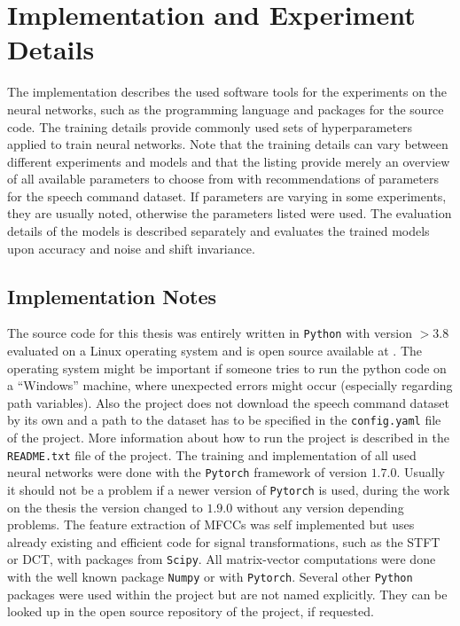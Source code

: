 
\section{Implementation and Experiment Details}\label{sec:exp_details}
The implementation describes the used software tools for the experiments on the neural networks, such as the programming language and packages for the source code.
The training details provide commonly used sets of hyperparameters applied to train neural networks.
Note that the training details can vary between different experiments and models and that the listing provide merely an overview of all available parameters to choose from with recommendations of parameters for the speech command dataset.
If parameters are varying in some experiments, they are usually noted, otherwise the parameters listed were used.
The evaluation details of the models is described separately and evaluates the trained models upon accuracy and noise and shift invariance.



\subsection{Implementation Notes}\label{sec:exp_details_implementation}
The source code for this thesis was entirely written in \texttt{Python} with version $>3.8$ evaluated on a Linux operating system and is open source available at \cite{KWSGame}.
The operating system might be important if someone tries to run the python code on a \enquote{Windows} machine, where unexpected errors might occur (especially regarding path variables).
Also the project does not download the speech command dataset by its own and a path to the dataset has to be specified in the \texttt{config.yaml} file of the project.
More information about how to run the project is described in the \texttt{README.txt} file of the project.
The training and implementation of all used neural networks were done with the \texttt{Pytorch} \cite{Pytorch} framework of version $1.7.0$. 
Usually it should not be a problem if a newer version of \texttt{Pytorch} is used, during the work on the thesis the version changed to $1.9.0$ without any version depending problems.
The feature extraction of MFCCs was self implemented but uses already existing and efficient code for signal transformations, such as the STFT or DCT, with packages from \texttt{Scipy}.
All matrix-vector computations were done with the well known package \texttt{Numpy} or with \texttt{Pytorch}.
Several other \texttt{Python} packages were used within the project but are not named explicitly.
They can be looked up in the open source repository of the project, if requested.


